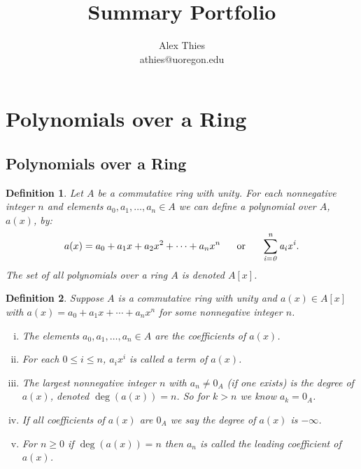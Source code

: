 \documentclass[letterpaper, 12pt]{article}
\newtheorem{defn}{Definition}
\begin{document}
	\title{Summary Portfolio}
	\author{Alex Thies \\ {\lowercase{athies$@$uoregon.edu}}}

	\maketitle

	\tableofcontents

	\newpage
	
	\setcounter{section}{6}
	\section{Polynomials over a Ring}
	\label{sec:polynomials_over_a_ring}
		\subsection{Polynomials over a Ring}
		\label{sub:polynomials_over_a_ring}
			\begin{defn}
			Let $A$ be a commutative ring with unity. 
			For each nonnegative integer $n$ and elements $a_{0}, a_{1}, \dots , a_{n} \in A$ we can define a polynomial over $A$, $a(x)$, by: $$a(x) = a_{0} + a_{1}x + a_{2}x^{2} + \cdots + a_{n}x^{n} \ \ \ \ \ \rm or \it \ \ \ \ \ \sum\limits_{i=0}^{n}a_{i}x^{i}.$$
			The set of all polynomials over a ring $A$ is denoted $A[x]$.
			\end{defn}
			\setcounter{defn}{3}
			\begin{defn}
			Suppose $A$ is a commutative ring with unity and $a(x) \in A[x]$ with $a(x) = a_{0} + a_{1}x + \cdots + a_{n}x^{n}$ for some nonnegative integer $n$.
				\begin{enumerate}[(i)]
				\item The elements $a_{0},a_{1}, \dots , a_{n} \in A$ are the coefficients of $a(x)$.
				\item For each $0 \leq i \leq n$, $a_{i}x^{i}$ is called a term of $a(x)$.
				\item The largest nonnegative integer $n$ with $a_{n} \neq 0_{A}$ (if one exists) is the degree of $a(x)$, denoted $\deg(a(x)) = n$. 
				So for $k > n$ we know $a_{k} = 0_{A}$.
				\item If all coefficients of $a(x)$ are $0_{A}$ we say the degree of $a(x)$ is $-\infty$.
				\item For $n \geq 0$ if $\deg(a(x)) = n$ then $a_{n}$ is called the leading coefficient of $a(x)$.
				\end{enumerate}
			\end{defn}
\end{document}
